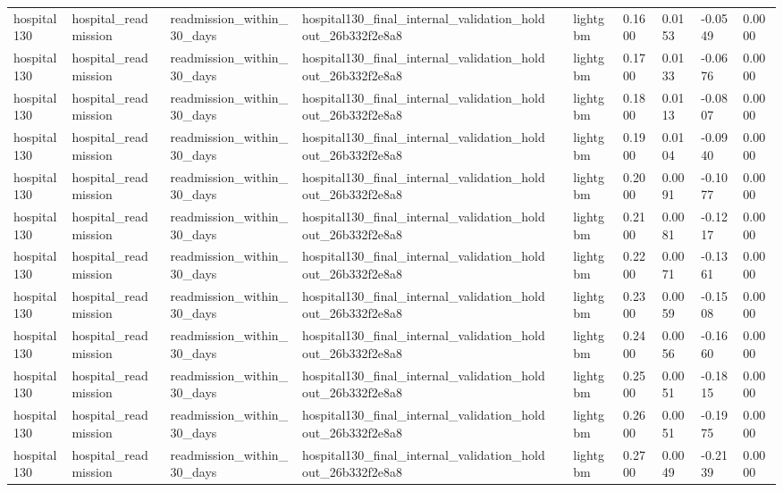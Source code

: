 \begin{tabular}{llllllllll}
hospital130 & hospital\_readmission & readmission\_within\_30\_days & hospital130\_final\_internal\_validation\_holdout\_26b332f2e8a8 &  & lightgbm & 0.1600 & 0.0153 & -0.0549 & 0.0000 \\
hospital130 & hospital\_readmission & readmission\_within\_30\_days & hospital130\_final\_internal\_validation\_holdout\_26b332f2e8a8 &  & lightgbm & 0.1700 & 0.0133 & -0.0676 & 0.0000 \\
hospital130 & hospital\_readmission & readmission\_within\_30\_days & hospital130\_final\_internal\_validation\_holdout\_26b332f2e8a8 &  & lightgbm & 0.1800 & 0.0113 & -0.0807 & 0.0000 \\
hospital130 & hospital\_readmission & readmission\_within\_30\_days & hospital130\_final\_internal\_validation\_holdout\_26b332f2e8a8 &  & lightgbm & 0.1900 & 0.0104 & -0.0940 & 0.0000 \\
hospital130 & hospital\_readmission & readmission\_within\_30\_days & hospital130\_final\_internal\_validation\_holdout\_26b332f2e8a8 &  & lightgbm & 0.2000 & 0.0091 & -0.1077 & 0.0000 \\
hospital130 & hospital\_readmission & readmission\_within\_30\_days & hospital130\_final\_internal\_validation\_holdout\_26b332f2e8a8 &  & lightgbm & 0.2100 & 0.0081 & -0.1217 & 0.0000 \\
hospital130 & hospital\_readmission & readmission\_within\_30\_days & hospital130\_final\_internal\_validation\_holdout\_26b332f2e8a8 &  & lightgbm & 0.2200 & 0.0071 & -0.1361 & 0.0000 \\
hospital130 & hospital\_readmission & readmission\_within\_30\_days & hospital130\_final\_internal\_validation\_holdout\_26b332f2e8a8 &  & lightgbm & 0.2300 & 0.0059 & -0.1508 & 0.0000 \\
hospital130 & hospital\_readmission & readmission\_within\_30\_days & hospital130\_final\_internal\_validation\_holdout\_26b332f2e8a8 &  & lightgbm & 0.2400 & 0.0056 & -0.1660 & 0.0000 \\
hospital130 & hospital\_readmission & readmission\_within\_30\_days & hospital130\_final\_internal\_validation\_holdout\_26b332f2e8a8 &  & lightgbm & 0.2500 & 0.0051 & -0.1815 & 0.0000 \\
hospital130 & hospital\_readmission & readmission\_within\_30\_days & hospital130\_final\_internal\_validation\_holdout\_26b332f2e8a8 &  & lightgbm & 0.2600 & 0.0051 & -0.1975 & 0.0000 \\
hospital130 & hospital\_readmission & readmission\_within\_30\_days & hospital130\_final\_internal\_validation\_holdout\_26b332f2e8a8 &  & lightgbm & 0.2700 & 0.0049 & -0.2139 & 0.0000 \\

\end{tabular}
